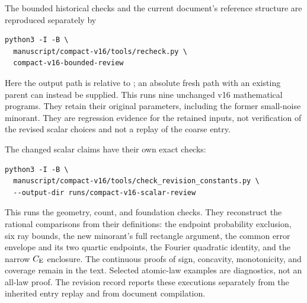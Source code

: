 The bounded historical checks and the current document's reference
structure are reproduced separately by
\begin{Verbatim}[fontsize=\small]
python3 -I -B \
  manuscript/compact-v16/tools/recheck.py \
  compact-v16-bounded-review
\end{Verbatim}
Here the output path is relative to ; an
absolute fresh path with an existing parent can instead be supplied.
This runs nine unchanged
v16 mathematical programs. They retain their original parameters,
including the former small-noise minorant. They are regression evidence
for the retained inputs, not verification of the revised scalar choices
and not a replay of the coarse entry.

The changed scalar claims have their own exact checks:
\begin{Verbatim}[fontsize=\small]
python3 -I -B \
  manuscript/compact-v16/tools/check_revision_constants.py \
  --output-dir runs/compact-v16-scalar-review
\end{Verbatim}
This runs the geometry, count, and foundation checks. They reconstruct
the rational comparisons from their definitions: the endpoint
probability exclusion, six ray bounds, the new minorant's full rectangle
argument, the common error envelope and its two quartic endpoints, the
Fourier quadratic identity, and the narrow $C_{\mathrm E}$ enclosure. The
continuous proofs of sign, concavity, monotonicity, and coverage remain
in the text. Selected atomic-law examples are diagnostics, not an
all-law proof. The revision record reports these executions separately
from the inherited entry replay and from document compilation.
